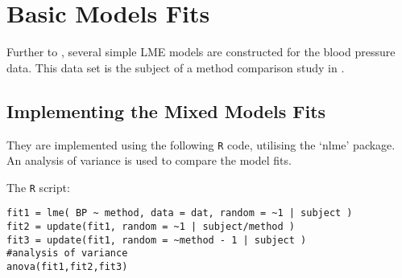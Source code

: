 \documentclass[12pt, a4paper]{article}
\begin{document}
\section{Basic Models Fits}
Further to \citet{PB}, several simple LME models are constructed
for the blood pressure data. This data set is the subject of a
method comparison study in \citet{BA99}.

\subsection{Implementing the Mixed Models Fits}
They are implemented using the following {\tt{R}} code, utilising the
`nlme' package. An analysis of variance is used to compare the model fits.

The {\tt{R}} script:
\begin{verbatim}
fit1 = lme( BP ~ method, data = dat, random = ~1 | subject )
fit2 = update(fit1, random = ~1 | subject/method )
fit3 = update(fit1, random = ~method - 1 | subject )
#analysis of variance
anova(fit1,fit2,fit3)
\end{verbatim}
\end{document}
